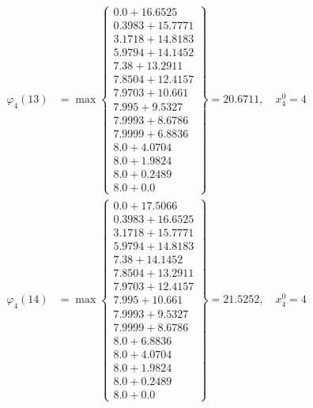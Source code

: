 \documentclass{article}
\begin{document}
\begin{align*}
  
  
  
\varphi_{4}(13) &= \max \left\{ \begin{array}{c}
0.0 + 16.6525 \\
 0.3983 + 15.7771 \\
 3.1718 + 14.8183 \\
 5.9794 + 14.1452 \\
 7.38 + 13.2911 \\
 7.8504 + 12.4157 \\
 7.9703 + 10.661 \\
 7.995 + 9.5327 \\
 7.9993 + 8.6786 \\
 7.9999 + 6.8836 \\
 8.0 + 4.0704 \\
 8.0 + 1.9824 \\
 8.0 + 0.2489 \\
 8.0 + 0.0
\end{array} \right\}=20.6711,\quad x_{4}^0=4\\
  
  
  
  
\varphi_{4}(14) &= \max \left\{ \begin{array}{c}
0.0 + 17.5066 \\
 0.3983 + 16.6525 \\
 3.1718 + 15.7771 \\
 5.9794 + 14.8183 \\
 7.38 + 14.1452 \\
 7.8504 + 13.2911 \\
 7.9703 + 12.4157 \\
 7.995 + 10.661 \\
 7.9993 + 9.5327 \\
 7.9999 + 8.6786 \\
 8.0 + 6.8836 \\
 8.0 + 4.0704 \\
 8.0 + 1.9824 \\
 8.0 + 0.2489 \\
 8.0 + 0.0
\end{array} \right\}=21.5252,\quad x_{4}^0=4\\
  
  
  

\end{align*}
\end{document}
